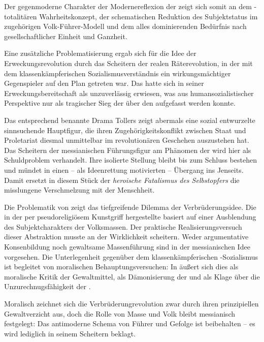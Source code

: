 Der gegenmoderne Charakter der Modernereflexion der  zeigt
sich somit an dem \Cite{messianisch}-totalitären Wahrheitskonzept, der
schematischen Reduktion des Subjektstatus im zugehörigen Volk-Führer-Modell
und dem alles dominierenden Bedürfnis nach gesellschaftlicher Einheit und
Ganzheit.

Eine zusätzliche Problematisierung ergab sich für die Idee der
Erweckungsrevolution durch das Scheitern der realen Räterevolution, in der mit
dem klassenkämpferischen Sozialismusverständnis ein wirkungsmächtiger
Gegenspieler auf den Plan getreten war. Das \Cite{Volk} hatte sich in seiner
Erweckungsbereitschaft als unzuverlässig erwiesen, was aus
humansozialistischer Perspektive nur als tragischer Sieg der \Cite{Masse} über
den \Cite{Menschen} aufgefasst werden konnte.

Das entsprechend benannte Drama Tollers zeigt abermals eine sozial entwurzelte
sinnsuchende Hauptfigur, die ihren Zugehörigkeitskonflikt zwischen Staat und
Proletariat diesmal unmittelbar im revolutionären Geschehen auszustehen hat. Das
Scheitern der messianischen Führungsfigur am Phänomen der \Cite{Masse} wird
hier als Schuldproblem
verhandelt. Ihre isolierte Stellung bleibt bis zum Schluss bestehen und mündet
in einen -- als Ideenrettung motivierten -- Übergang ins Jenseits. Damit ersetzt
in diesem Stück der \emph{heroische Fatalismus des Selbstopfers} die misslungene
Verschmelzung mit der Menschheit.

Die Problematik von  zeigt das tiefgreifende Dilemma der
Verbrüderungsidee. Die in der  per pseudoreligiösem Kunstgriff
hergestellte \Cite{Gemeinschaft} basiert auf einer Ausblendung des
Subjektcharakters der Volksmassen. Der praktische Realisierungsversuch dieser
Abstraktion musste an der Wirklichkeit scheitern. Weder argumentative
Konsenbildung noch gewaltsame Massenführung sind in der messianischen Idee
vorgesehen. Die Unterlegenheit gegenüber dem klassenkämpferischen
\Cite{Massen}-Sozialismus ist begleitet von moralischen Behauptungsversuchen: 
In  äußert sich dies als moralische Kritik der
Gewaltmittel, als Dämonisierung der 
und als Klage über die Unzurechnugsfähigkeit der \Cite{Masse}.

Moralisch zeichnet sich die Verbrüderungrevolution zwar durch
ihren prinzipiellen Gewaltverzicht aus, doch die Rolle von Masse und Volk
bleibt messianisch festgelegt: Das antimoderne Schema von Führer und
Gefolge ist beibehalten -- es wird lediglich in seinem \Cite{tragischen}
Scheitern beklagt. 

